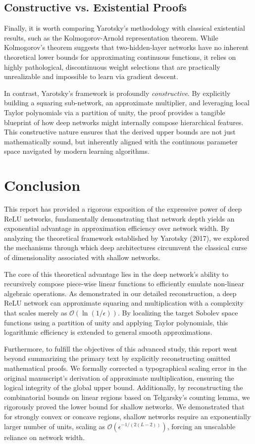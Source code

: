 \documentclass[12pt]{article}
\begin{document}
\subsection{Constructive vs. Existential Proofs}
Finally, it is worth comparing Yarotsky's methodology with classical existential results, such as the Kolmogorov-Arnold representation theorem. While Kolmogorov's theorem suggests that two-hidden-layer networks have no inherent theoretical lower bounds for approximating continuous functions, it relies on highly pathological, discontinuous weight selections that are practically unrealizable and impossible to learn via gradient descent.

In contrast, Yarotsky's framework is profoundly \textit{constructive}. By explicitly building a squaring sub-network, an approximate multiplier, and leveraging local Taylor polynomials via a partition of unity, the proof provides a tangible blueprint of how deep networks might internally compose hierarchical features. This constructive nature ensures that the derived upper bounds are not just mathematically sound, but inherently aligned with the continuous parameter space navigated by modern learning algorithms.



\section{Conclusion}

This report has provided a rigorous exposition of the expressive power of deep ReLU networks, fundamentally demonstrating that network depth yields an exponential advantage in approximation efficiency over network width. By analyzing the theoretical framework established by Yarotsky (2017), we explored the mechanisms through which deep architectures circumvent the classical curse of dimensionality associated with shallow networks.

The core of this theoretical advantage lies in the deep network's ability to recursively compose piece-wise linear functions to efficiently emulate non-linear algebraic operations. As demonstrated in our detailed reconstruction, a deep ReLU network can approximate squaring and multiplication with a complexity that scales merely as $\mathcal{O}(\ln(1/\epsilon))$. By localizing the target Sobolev space functions using a partition of unity and applying Taylor polynomials, this logarithmic efficiency is extended to general smooth approximations. 

Furthermore, to fulfill the objectives of this advanced study, this report went beyond summarizing the primary text by explicitly reconstructing omitted mathematical proofs. We formally corrected a typographical scaling error in the original manuscript's derivation of approximate multiplication, ensuring the logical integrity of the global upper bound. Additionally, by reconstructing the combinatorial bounds on linear regions based on Telgarsky's counting lemma, we rigorously proved the lower bound for shallow networks. We demonstrated that for strongly convex or concave regions, shallow networks require an exponentially larger number of units, scaling as $\mathcal{O}(\epsilon^{-1/(2(L-2))})$, forcing an unscalable reliance on network width.
\end{document}
